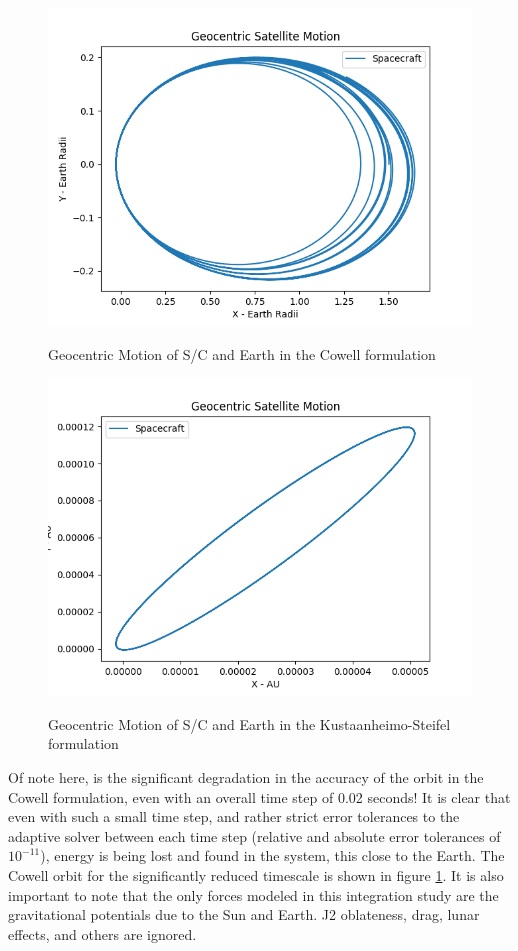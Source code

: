 \documentclass[11pt,twoside,letterpaper]{article}
\begin{document}
  \begin{figure}
    \caption{Geocentric Motion of S/C and Earth in the Cowell formulation}
    \centering
    \includegraphics[scale=0.5]{GeoPlanarPath}
    \label{cowPathGeo}
  \end{figure}

  \begin{figure}
    \caption{Geocentric Motion of S/C and Earth in the Kustaanheimo-Steifel formulation}
    \centering
    \includegraphics[scale=0.5]{PlanarPathKSGeo}
    \label{kspathGeo}
  \end{figure}

  Of note here, is the significant degradation in the accuracy of the
  orbit in the Cowell formulation, even with an overall time step of
  0.02 seconds! It is clear that even with such a small time step, and
  rather strict error tolerances to the adaptive solver between each
  time step (relative and absolute error tolerances of
  \( 10^{-11} \)), energy is being lost and found in the system, this
  close to the Earth. The Cowell orbit for the significantly reduced
  timescale is shown in figure \ref{cowPathGeo}. It is also important
  to note that the only forces modeled in this integration study are
  the gravitational potentials due to the Sun and Earth. J2
  oblateness, drag, lunar effects, and others are ignored. 
  
\end{document}
